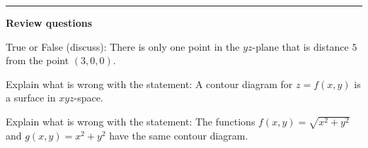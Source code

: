 \documentclass[12pt,letterpaper,noanswers]{exam}
\begin{document}
\vspace{0.2cm}
\hrule
\vspace{0.2cm}


\noindent\textbf{Review questions}

\begin{questions}
\item True or False (discuss): There is only one point in the $yz$-plane that is distance $5$ from the point $(3,0,0)$.
\item Explain what is wrong with the statement: A contour diagram for $z = f(x,y)$ is a surface in $xyz$-space.
\item Explain what is wrong with the statement: The functions $f(x,y) = \sqrt{x^2+y^2}$ and $g(x,y) = x^2+y^2$ have the same contour diagram.
\end{questions}
\end{document}
